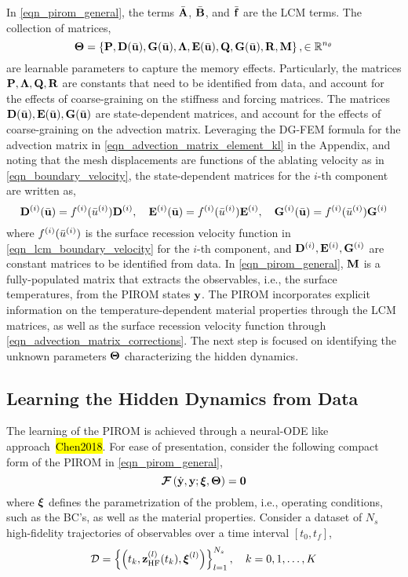 In \cref{eqn_pirom_general}, the terms $\bar{\mathbf{A}}$, $\bar{\mathbf{B}}$, and $\bar{\mathbf{f}}$ are the LCM terms. The collection of matrices,
\begin{equation}
    \boldsymbol{\Theta} = \left\{\mathbf{P},\mathbf{D}(\bar{\mathbf{u}}),\mathbf{G}(\bar{\mathbf{u}}),\boldsymbol{\Lambda},\mathbf{E}(\bar{\mathbf{u}}),\mathbf{Q},\mathbf{G}(\bar{\mathbf{u}}),\mathbf{R},\mathbf{M}\right\},\in\mathbb{R}^{n_{\theta}}
\end{equation}
are learnable parameters to capture the memory effects. Particularly, the matrices $\mathbf{P},\boldsymbol{\Lambda},\mathbf{Q},\mathbf{R}$ are constants that need to be identified from data, and account for the effects of coarse-graining on the stiffness and forcing matrices. The matrices $\mathbf{D}(\bar{\mathbf{u}}),\mathbf{E}(\bar{\mathbf{u}}),\mathbf{G}(\bar{\mathbf{u}})$ are state-dependent matrices, and account for the effects of coarse-graining on the advection matrix. Leveraging the DG-FEM formula for the advection matrix in \cref{eqn_advection_matrix_element_kl} in the Appendix, and noting that the mesh displacements are functions of the ablating velocity as in \cref{eqn_boundary_velocity}, the state-dependent matrices for the $i$-th component are written as,
\begin{equation}
    \mathbf{D}^{(i)}(\bar{\mathbf{u}}) = f^{(i)}(\bar{u}^{(i)})\mathbf{D}^{(i)}, \quad \mathbf{E}^{(i)}(\bar{\mathbf{u}}) = f^{(i)}(\bar{u}^{(i)})\mathbf{E}^{(i)}, \quad \mathbf{G}^{(i)}(\bar{\mathbf{u}}) = f^{(i)}(\bar{u}^{(i)})\mathbf{G}^{(i)}\label{eqn_advection_matrix_corrections}
\end{equation}
where $f^{(i)}(\bar{u}^{(i)})$ is the surface recession velocity function in \cref{eqn_lcm_boundary_velocity} for the $i$-th component, and $\mathbf{D}^{(i)},\mathbf{E}^{(i)},\mathbf{G}^{(i)}$ are constant matrices to be identified from data. In \cref{eqn_pirom_general}, $\mathbf{M}$ is a fully-populated matrix that extracts the observables, i.e., the surface temperatures, from the PIROM states $\mathbf{y}$. The PIROM incorporates explicit information on the temperature-dependent material properties through the LCM matrices, as well as the surface recession velocity function through \cref{eqn_advection_matrix_corrections}. The next step is focused on identifying the unknown parameters $\boldsymbol{\Theta}$ characterizing the hidden dynamics.

\subsection{Learning the Hidden Dynamics from Data}

The learning of the PIROM is achieved through a neural-ODE like approach~\hl{Chen2018}. For ease of presentation, consider the following compact form of the PIROM in \cref{eqn_pirom_general},
\begin{equation}
    \boldsymbol{\mathcal{F}}\left(\dot{\mathbf{y}},\mathbf{y};\boldsymbol{\xi},\boldsymbol{\Theta}\right) = \boldsymbol{0}\label{eqn_pirom_compact}
\end{equation}
where $\boldsymbol{\xi}$ defines the parametrization of the problem, i.e., operating conditions, such as the BC's, as well as the material properties. Consider a dataset of $N_s$ high-fidelity trajectories of observables over a time interval $[t_0,t_f]$,
\begin{equation}
    \mathcal{D} = \left\{\left(t_k,\mathbf{z}^{(l)}_{\text{HF}}(t_k),\boldsymbol{\xi}^{(l)}\right)\right\}_{l=1}^{N_s},\quad k=0,1,\dots,K
\end{equation}

